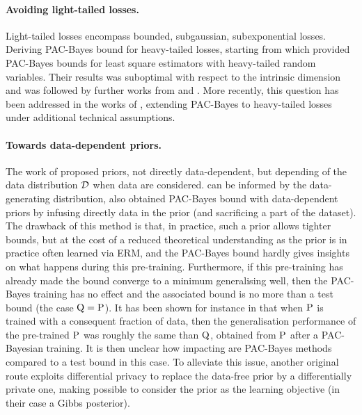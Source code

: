 \paragraph{Avoiding light-tailed losses.} Light-tailed losses encompass bounded, subgaussian, subexponential losses. Deriving PAC-Bayes bound for heavy-tailed losses, starting from \citet{audibert2011robust} which provided PAC-Bayes bounds for least square estimators with heavy-tailed random variables. Their results was suboptimal with respect to the intrinsic dimension and was followed by further works from \citet{catoni2016pac} and \citet{catoni2017dimension}.
More recently, this question has been addressed in the works of \citet{alquier2018simpler, holland2019pac,kuzborskij2019efron,haddouche2021pac}, extending PAC-Bayes to heavy-tailed losses under additional technical assumptions.

\paragraph{Towards data-dependent priors.} The work of \citep{catoni2007pac,lever2010distribution,lever2013tighter} proposed priors, not directly data-dependent, but depending of the data distribution $\Dcal$ when \iid data are considered. can be informed by the
data-generating distribution, \citet{parradohernandez2012pac,oneto2016pac,dziugaite2017computing,mhammedi2019pac} also obtained PAC-Bayes bound with data-dependent priors by infusing directly data in the prior (and sacrificing a part of the dataset). The drawback of this method is that, in practice, such a prior allows tighter bounds, but at the cost of a reduced theoretical understanding as the prior is in practice often learned via ERM, and the PAC-Bayes bound hardly gives insights on what happens during this pre-training. Furthermore, if this pre-training has already made the bound converge to a minimum generalising well, then the PAC-Bayes training has no effect and the associated bound is no more than a test bound (the case $\Q=\P$). It has been shown for instance in \citep{perezortiz2021learning} that when $\P$ is trained with a consequent fraction of data, then the generalisation performance of the pre-trained $\P$ was roughly the same than $\Q$, obtained from $\P$ after a PAC-Bayesian training. It is then unclear how impacting are PAC-Bayes methods compared to a test bound in this case. To alleviate this issue, another original route \citep{dziugaite2018data} exploits differential privacy to replace the data-free prior by a differentially private one, making possible to consider the prior as the learning objective (in their case a Gibbs posterior).

